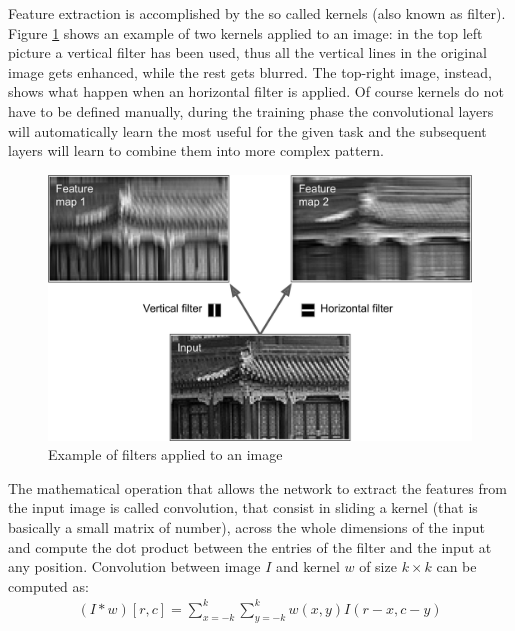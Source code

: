 Feature extraction is accomplished by the so called kernels (also known as filter). Figure \ref{fig:fifth_figure} shows an example of two kernels applied to an image: in the top left picture a vertical filter has been used, thus all the vertical lines in the original image gets enhanced, while the rest gets blurred. The top-right image, instead, shows what happen when an horizontal filter is applied. Of course kernels do not have to be defined manually, during the training phase the convolutional layers will automatically learn the most useful for the given task and the subsequent layers will learn to combine them into more complex pattern.
\vspace{5mm}
\begin{figure}[htbp!]
\centering
\includegraphics[scale=0.8]{Tesi/images/FeatureMap}
\caption{Example of filters applied to an image \cite{mlbook}}
\label{fig:fifth_figure}
\end{figure}

\vspace{5mm} %

The mathematical operation that allows the network to extract the features from the input image is called convolution, that consist in sliding a kernel (that is basically a small matrix of number), across the whole dimensions of the input and compute the dot product between the entries of the filter and the input at any position. Convolution between image $I$ and kernel $w$ of size $k \times k$ can be computed as:
\begin{equation} \label{eq:first_equation}
\begin{gathered}
(I\ast w)\left [ r,c \right ]  = \sum_{x=-k}^{k}  \sum_{y=-k}^{k} w(x,y)I(r-x, c-y)
\end{gathered}
\end{equation}

